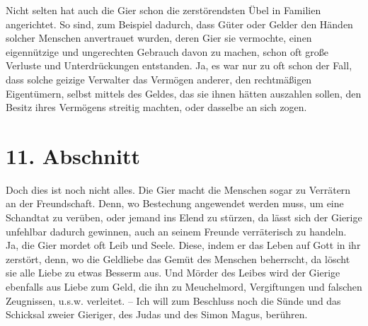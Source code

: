 Nicht selten hat auch die Gier schon die zerstörendsten Übel in Familien
angerichtet. So sind, zum Beispiel dadurch, dass Güter oder Gelder den Händen solcher
Menschen anvertrauet wurden, deren Gier sie vermochte, einen eigennützige und
ungerechten Gebrauch davon zu machen, schon oft große Verluste und
Unterdrückungen entstanden. Ja, es war nur zu oft schon der Fall, dass solche
geizige Verwalter das Vermögen anderer, den rechtmäßigen Eigentümern, selbst
mittels des Geldes, das sie ihnen hätten auszahlen sollen, den Besitz ihres
Vermögens streitig machten, oder dasselbe an sich zogen.

\section{11. Abschnitt} \label{kap13_ab11}

Doch dies ist noch nicht alles. Die Gier macht die Menschen sogar zu Verrätern
an der Freundschaft. Denn, wo Bestechung angewendet werden
muss, um eine
Schandtat zu verüben, oder jemand ins Elend zu stürzen, da lässt sich der
Gierige unfehlbar dadurch gewinnen, auch an seinem Freunde verräterisch zu
handeln. Ja, die Gier mordet oft Leib und Seele. Diese, indem er das Leben auf
Gott in ihr zerstört, denn, wo die Geldliebe das Gemüt des Menschen
beherrscht, da löscht sie alle Liebe zu etwas Besserm aus. Und
Mörder des Leibes
wird der Gierige ebenfalls aus Liebe zum Geld, die ihn zu Meuchelmord,
Vergiftungen und falschen Zeugnissen, u.s.w. verleitet. -- Ich will zum
Beschluss noch die Sünde und das Schicksal zweier Gieriger, des
Judas und des
Simon Magus,  berühren.

\medskip


